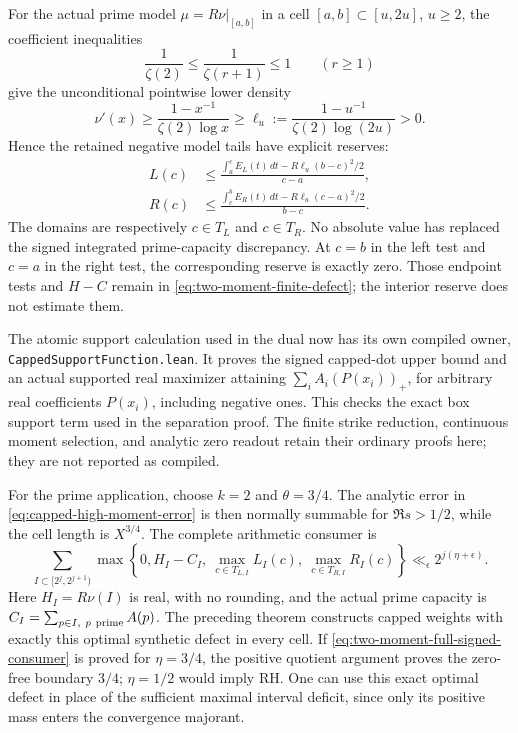 \documentclass[11pt]{article}
\theoremstyle{definition}
\begin{document}
For the actual prime model $\mu=R\nu|_{[a,b]}$ in a cell
$[a,b]\subset[u,2u]$, $u\ge2$, the coefficient inequalities
\[
 \frac1{\zeta(2)}\le\frac1{\zeta(r+1)}\le1
                       \qquad(r\ge1)
\]
give the unconditional pointwise lower density
\[
 \nu'(x)\ge\frac{1-x^{-1}}{\zeta(2)\log x}
       \ge \ell_u:=
            \frac{1-u^{-1}}{\zeta(2)\log(2u)}>0.
\]
Hence the retained negative model tails have explicit reserves:
\begin{align}
 L(c)&\le
 \frac{\displaystyle\int_a^c E_L(t)\,dt
                         -R\ell_u(b-c)^2/2}{c-a},
 \label{eq:two-moment-left-reserve}\\
 R(c)&\le
 \frac{\displaystyle\int_c^b E_R(t)\,dt
                         -R\ell_u(c-a)^2/2}{b-c}.
 \label{eq:two-moment-right-reserve}
\end{align}
The domains are respectively $c\in T_L$ and $c\in T_R$.
No absolute value has replaced the signed integrated
prime-capacity discrepancy. At $c=b$ in the left test and
$c=a$ in the right test, the corresponding reserve is
exactly zero. Those endpoint tests and $H-C$ remain in
\eqref{eq:two-moment-finite-defect}; the interior reserve
does not estimate them.

The atomic support calculation used in the dual now has
its own compiled owner,
\texttt{CappedSupportFunction.lean}.
It proves the signed capped-dot upper bound and an actual
supported real maximizer attaining
$\sum_i A_i(P(x_i))_+$, for arbitrary real coefficients
$P(x_i)$, including negative ones.
This checks the exact box support term used in the separation
proof. The finite strike reduction, continuous moment selection,
and analytic zero readout retain their ordinary proofs here;
they are not reported as compiled.

For the prime application, choose $k=2$ and $\theta=3/4$.
The analytic error in
\eqref{eq:capped-high-moment-error} is then normally summable
for $\Re s>1/2$, while the cell length is $X^{3/4}$.
The complete arithmetic consumer is
\begin{equation}
 \sum_{I\subset[2^j,2^{j+1})}
 \max\left\{0,H_I-C_I,\
            \max_{c\in T_{L,I}}L_I(c),\
            \max_{c\in T_{R,I}}R_I(c)\right\}
       \ll_\epsilon 2^{j(\eta+\epsilon)} .
 \label{eq:two-moment-full-signed-consumer}
\end{equation}
Here $H_I=R\nu(I)$ is real, with no rounding, and the actual
prime capacity is
$C_I=\sum_{p\in I,\ p\ {\rm prime}}A(p)$.
The preceding theorem constructs capped weights with exactly
this optimal synthetic defect in every cell.
If \eqref{eq:two-moment-full-signed-consumer} is proved for
$\eta=3/4$, the positive quotient argument proves the
zero-free boundary $3/4$; $\eta=1/2$ would imply RH.
One can use this exact optimal defect in place of the sufficient
maximal interval deficit, since only its positive mass enters
the convergence majorant.
\end{document}
